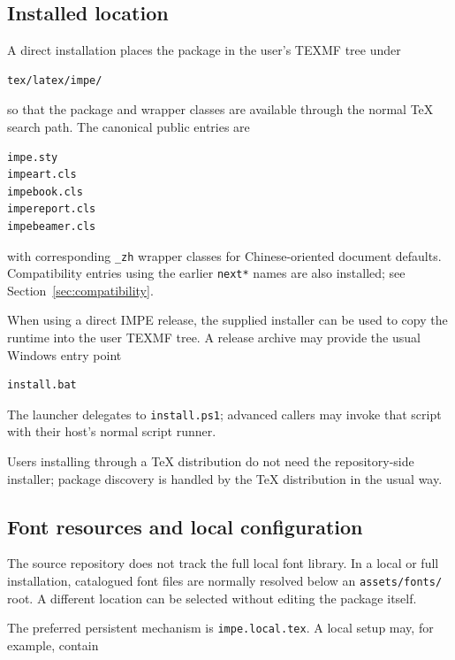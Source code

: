 \documentclass[11pt]{impeart}
\begin{document}
\subsection{Installed location}

A direct installation places the package in the user's TEXMF tree under

\begin{verbatim}
tex/latex/impe/
\end{verbatim}

so that the package and wrapper classes are available through the normal \TeX{}
search path.  The canonical public entries are

\begin{verbatim}
impe.sty
impeart.cls
impebook.cls
impereport.cls
impebeamer.cls
\end{verbatim}

with corresponding \texttt{\_zh} wrapper classes for Chinese-oriented document
defaults.  Compatibility entries using the earlier \texttt{next*} names are
also installed; see Section~\ref{sec:compatibility}.

When using a direct IMPE release, the supplied installer can be used to copy the
runtime into the user TEXMF tree.  A release archive may provide the usual
Windows entry point

\begin{verbatim}
install.bat
\end{verbatim}

The launcher delegates to \texttt{install.ps1}; advanced callers may invoke
that script with their host's normal script runner.

Users installing through a \TeX{} distribution do not need the repository-side
installer; package discovery is handled by the \TeX{} distribution in the usual
way.

\subsection{Font resources and local configuration}

The source repository does not track the full local font library.  In a local
or full installation, catalogued font files are normally resolved below an
\texttt{assets/fonts/} root.  A different location can be selected without
editing the package itself.

The preferred persistent mechanism is \texttt{impe.local.tex}.  A local setup
may, for example, contain
\end{document}
